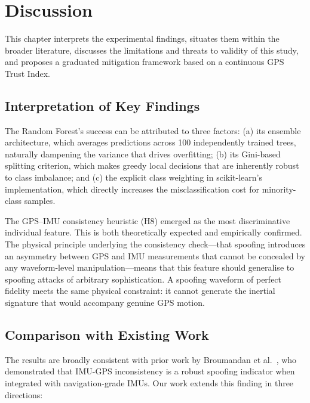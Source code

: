 \chapter{Discussion}

This chapter interprets the experimental findings, situates them within the broader literature, discusses the limitations and threats to validity of this study, and proposes a graduated mitigation framework based on a continuous GPS Trust Index.

\section{Interpretation of Key Findings}

The Random Forest's success can be attributed to three factors: (a) its ensemble architecture, which averages predictions across 100 independently trained trees, naturally dampening the variance that drives overfitting; (b) its Gini-based splitting criterion, which makes greedy local decisions that are inherently robust to class imbalance; and (c) the explicit class weighting in scikit-learn's implementation, which directly increases the misclassification cost for minority-class samples.

The GPS--IMU consistency heuristic (H8) emerged as the most discriminative individual feature. This is both theoretically expected and empirically confirmed. The physical principle underlying the consistency check---that spoofing introduces an asymmetry between GPS and IMU measurements that cannot be concealed by any waveform-level manipulation---means that this feature should generalise to spoofing attacks of arbitrary sophistication. A spoofing waveform of perfect fidelity meets the same physical constraint: it cannot generate the inertial signature that would accompany genuine GPS motion.

\section{Comparison with Existing Work}

The results are broadly consistent with prior work by Broumandan et al.~\cite{Broumandan2020}, who demonstrated that IMU-GPS inconsistency is a robust spoofing indicator when integrated with navigation-grade IMUs. Our work extends this finding in three directions:

